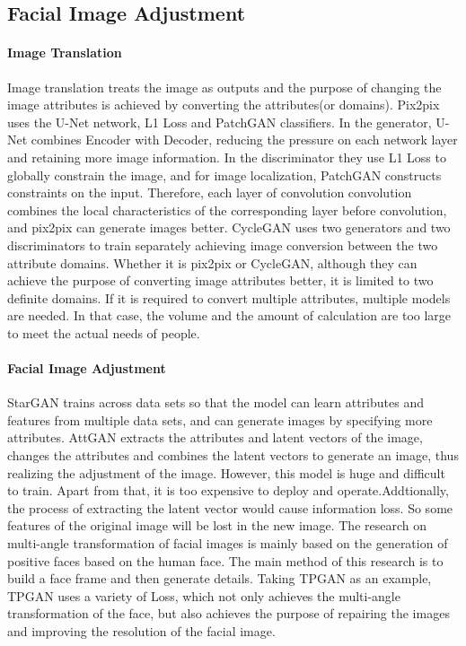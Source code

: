 \subsection{Facial Image Adjustment}

\paragraph{Image Translation}

Image translation treats the image as outputs and the purpose of changing the image attributes is achieved by converting the attributes(or domains).
Pix2pix uses the U-Net network, L1 Loss and PatchGAN classifiers.
In the generator, U-Net combines Encoder with Decoder,
    reducing the pressure on each network layer and retaining more image information.
In the discriminator they use L1 Loss to globally constrain the image, and for image localization, PatchGAN constructs constraints on the input.
Therefore, each layer of convolution convolution combines the local characteristics of the corresponding layer before convolution,
    and pix2pix can generate images better.
CycleGAN uses two generators and two discriminators to train separately achieving image conversion between the two attribute domains.
Whether it is pix2pix or CycleGAN,
    although they can achieve the purpose of converting image attributes better,
    it is limited to two definite domains.
If it is required to convert multiple attributes, multiple models are needed.
In that case, the volume and the amount of calculation are too large to meet the actual needs of people.

\paragraph{Facial Image Adjustment}
StarGAN trains across data sets so that the model can learn attributes and features from multiple data sets,
    and can generate images by specifying more attributes.
AttGAN extracts the attributes and latent vectors of the image,
    changes the attributes and combines the latent vectors to generate an image,
    thus realizing the adjustment of the image. However,
    this model is huge and difficult to train.
Apart from that, it is too expensive to deploy and operate.Addtionally,
    the process of extracting the latent vector would cause information loss.
So some features of the original image will be lost in the new image.
The research on multi-angle transformation of facial images is mainly based on the generation of positive faces based on the human face. 
The main method of this research is to build a face frame and then generate details.
Taking TPGAN as an example, TPGAN uses a variety of Loss,
    which not only achieves the multi-angle transformation of the face,
    but also achieves the purpose of repairing the images and improving the resolution of the facial image.

